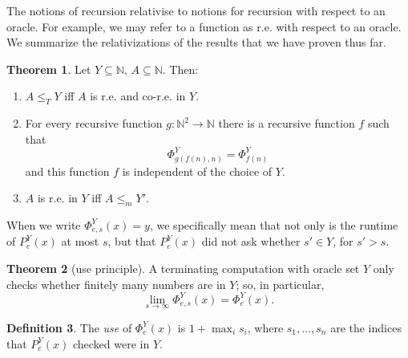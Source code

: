 \documentclass[12pt]{report}
\newcommand{\NN}{\mathbb{N}}
\newcommand{\dfn}[1]{\emph{#1}\index{#1}}
\theoremstyle{definition}
\newtheorem{theorem}{Theorem}[chapter]
\newtheorem{definition}[theorem]{Definition}
\begin{document}
The notions of recursion relativise to notions for recursion with respect to an oracle. For example, we may refer to a function as r.e. with respect to an oracle. We summarize the relativizations of the results that we have proven thus far.
\begin{theorem}
Let $Y \subseteq \NN$, $A \subseteq \NN$. Then:
\begin{enumerate}
  \item $A \leq_T Y$ iff $A$ is r.e. and co-r.e. in $Y$.
  \item For every recursive function $g: \NN^2 \to \NN$ there is a recursive function $f$ such that
  $$\Phi^Y_{g(f(n), n)} = \Phi^Y_{f(n)}$$
  and this function $f$ is independent of the choice of $Y$.
  \item $A$ is r.e. in $Y$ iff $A \leq_m Y'$.
\end{enumerate}
\end{theorem}

When we write $\Phi_{e,s}^Y(x) = y$, we specifically mean that not only is the runtime of $P_e^Y(x)$ at most $s$, but that $P_e^Y(x)$ did not ask whether $s' \in Y$, for $s' > s$.

\begin{theorem}[use principle]
A terminating computation with oracle set $Y$ only checks whether finitely many numbers are in $Y$; so, in particular,
$$\lim_{s \to \infty} \Phi_{e,s}^Y(x) = \Phi_e^Y(x).$$
\end{theorem}
\begin{definition}
The \dfn{use} of $\Phi_e^Y(x)$ is $1 + \max_i s_i$, where $s_1, \dots, s_n$ are the indices that $P_e^Y(x)$ checked were in $Y$.
\end{definition}
\end{document}
